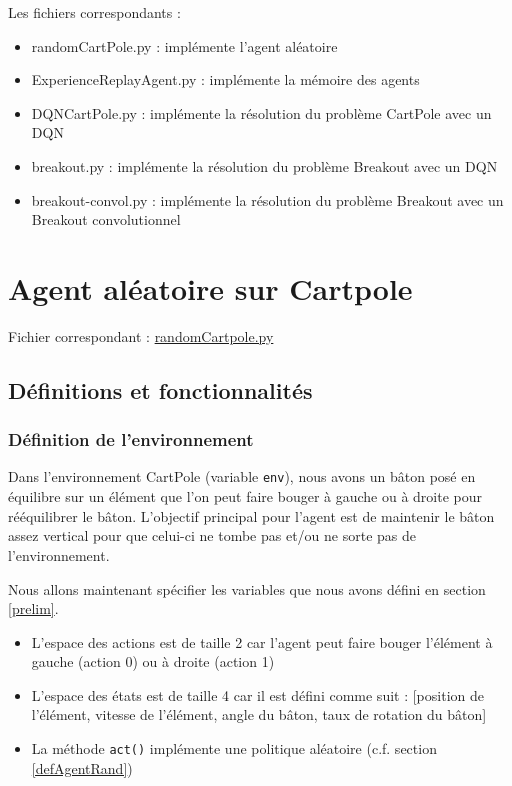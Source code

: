 \documentclass[10pt,a4paper]{article}
\begin{document}
Les fichiers correspondants :
\begin{itemize}
	\item randomCartPole.py : implémente l'agent aléatoire
	\item ExperienceReplayAgent.py : implémente la mémoire des agents
	\item DQNCartPole.py : implémente la résolution du problème CartPole avec un DQN
	\item breakout.py : implémente la résolution du problème Breakout avec un DQN
	\item breakout-convol.py : implémente la résolution du problème Breakout avec un Breakout convolutionnel
\end{itemize}


\section{Agent aléatoire sur Cartpole}

Fichier correspondant : \href{https://github.com/NellyBarret/IA5-TP-APR/blob/master/randomCartPole.py}{randomCartpole.py}

\subsection{Définitions et fonctionnalités}
\subsubsection{Définition de l'environnement}
Dans l'environnement CartPole (variable \lstinline{env}), nous avons un bâton posé en équilibre sur un élément que l'on peut faire bouger à gauche ou à droite pour rééquilibrer le bâton. L'objectif principal pour l'agent est de maintenir le bâton assez vertical pour que celui-ci ne tombe pas et/ou ne sorte pas de l'environnement.

Nous allons maintenant spécifier les variables que nous avons défini en section \ref{prelim}.
\begin{itemize}
	\item L'espace des actions est de taille 2 car l'agent peut faire bouger l'élément à gauche (action 0) ou à droite (action 1)
	\item L'espace des états est de taille 4 car il est défini comme suit : [position de l'élément, vitesse de l'élément, angle du bâton, taux de rotation du bâton]
	\item La méthode \lstinline{act()} implémente une politique aléatoire (c.f. section \ref{defAgentRand})
\end{itemize}
\end{document}
